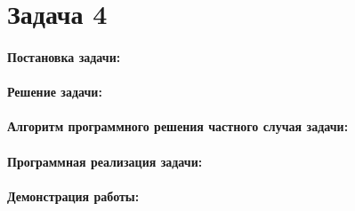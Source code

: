 {
    \section*{Задача 4}
    \paragraph{Постановка задачи:}
    \paragraph{Решение задачи:}
    \paragraph{Алгоритм программного решения частного случая задачи:}
    \paragraph{Программная реализация задачи:}
    \paragraph{Демонстрация работы:}
}
